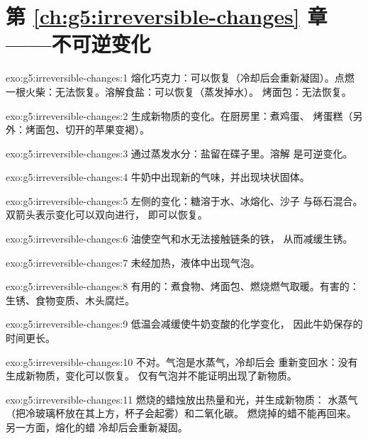 \section*{第 \ref{ch:g5:irreversible-changes} 章——不可逆变化}

\begin{solution}{exo:g5:irreversible-changes:1}
熔化巧克力：可以恢复（冷却后会重新凝固）。点燃
一根火柴：无法恢复。溶解食盐：可以恢复（蒸发掉水）。
烤面包：无法恢复。
\end{solution}

\begin{solution}{exo:g5:irreversible-changes:2}
生成新物质的变化。在厨房里：煮鸡蛋、
烤蛋糕（另外：烤面包、切开的苹果变褐）。
\end{solution}

\begin{solution}{exo:g5:irreversible-changes:3}
通过蒸发水分：盐留在碟子里。溶解
是可逆变化。
\end{solution}

\begin{solution}{exo:g5:irreversible-changes:4}
牛奶中出现新的气味，并出现块状固体。
\end{solution}

\begin{solution}{exo:g5:irreversible-changes:5}
左侧的变化：糖溶于水、冰熔化、沙子
与砾石混合。双箭头表示变化可以双向进行，
即可以恢复。
\end{solution}

\begin{solution}{exo:g5:irreversible-changes:6}
油使空气和水无法接触链条的铁，
从而减缓生锈。
\end{solution}

\begin{solution}{exo:g5:irreversible-changes:7}
未经加热，液体中出现气泡。
\end{solution}

\begin{solution}{exo:g5:irreversible-changes:8}
有用的：煮食物、烤面包、燃烧燃气取暖。有害的：
生锈、食物变质、木头腐烂。
\end{solution}

\begin{solution}{exo:g5:irreversible-changes:9}
低温会减缓使牛奶变酸的化学变化，
因此牛奶保存的时间更长。
\end{solution}

\begin{solution}{exo:g5:irreversible-changes:10}
不对。气泡是水蒸气，冷却后会
重新变回水：没有生成新物质，变化可以恢复。
仅有气泡并不能证明出现了新物质。
\end{solution}

\begin{solution}{exo:g5:irreversible-changes:11}
燃烧的蜡烛放出热量和光，并生成新物质：
水蒸气（把冷玻璃杯放在其上方，杯子会起雾）和二氧化碳。
燃烧掉的蜡不能再回来。另一方面，熔化的蜡
冷却后会重新凝固。
\end{solution}
